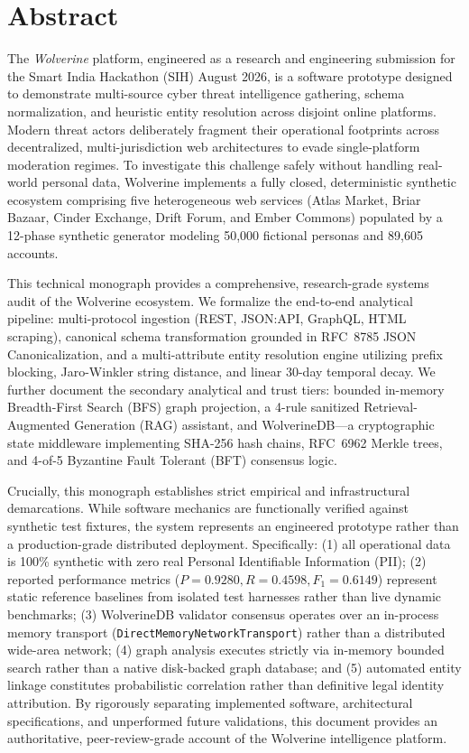 \chapter*{Abstract}

The \textit{Wolverine} platform, engineered as a research and engineering submission for the Smart India Hackathon (SIH) August 2026, is a software prototype designed to demonstrate multi-source cyber threat intelligence gathering, schema normalization, and heuristic entity resolution across disjoint online platforms. Modern threat actors deliberately fragment their operational footprints across decentralized, multi-jurisdiction web architectures to evade single-platform moderation regimes. To investigate this challenge safely without handling real-world personal data, Wolverine implements a fully closed, deterministic synthetic ecosystem comprising five heterogeneous web services (Atlas Market, Briar Bazaar, Cinder Exchange, Drift Forum, and Ember Commons) populated by a 12-phase synthetic generator modeling 50,000 fictional personas and 89,605 accounts.

This technical monograph provides a comprehensive, research-grade systems audit of the Wolverine ecosystem. We formalize the end-to-end analytical pipeline: multi-protocol ingestion (REST, JSON:API, GraphQL, HTML scraping), canonical schema transformation grounded in RFC~8785 JSON Canonicalization, and a multi-attribute entity resolution engine utilizing prefix blocking, Jaro-Winkler string distance, and linear 30-day temporal decay. We further document the secondary analytical and trust tiers: bounded in-memory Breadth-First Search (BFS) graph projection, a 4-rule sanitized Retrieval-Augmented Generation (RAG) assistant, and WolverineDB---a cryptographic state middleware implementing SHA-256 hash chains, RFC~6962 Merkle trees, and 4-of-5 Byzantine Fault Tolerant (BFT) consensus logic.

Crucially, this monograph establishes strict empirical and infrastructural demarcations. While software mechanics are functionally verified against synthetic test fixtures, the system represents an engineered prototype rather than a production-grade distributed deployment. Specifically: (1) all operational data is 100\% synthetic with zero real Personal Identifiable Information (PII); (2) reported performance metrics ($P=0.9280, R=0.4598, F_1=0.6149$) represent static reference baselines from isolated test harnesses rather than live dynamic benchmarks; (3) WolverineDB validator consensus operates over an in-process memory transport (\texttt{DirectMemoryNetworkTransport}) rather than a distributed wide-area network; (4) graph analysis executes strictly via in-memory bounded search rather than a native disk-backed graph database; and (5) automated entity linkage constitutes probabilistic correlation rather than definitive legal identity attribution. By rigorously separating implemented software, architectural specifications, and unperformed future validations, this document provides an authoritative, peer-review-grade account of the Wolverine intelligence platform.
